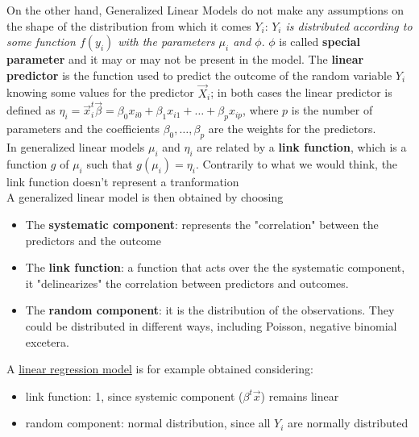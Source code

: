     On the other hand, Generalized Linear Models do not make any assumptions on
    the shape of the distribution from which it comes $Y_i$:  \emph{$Y_i$ is
    distributed according to some function $f(y_i)$ with the parameters $\mu_i$
    and $\phi$}. $\phi$ is called \textbf{special parameter} and it may or may
    not be present in the model. The \textbf{linear predictor} is the function
    used to predict the outcome of the random variable $Y_i$ knowing some values
    for the predictor $\vec{X}_i$; in both cases the linear predictor is defined
    as $\eta_i = \vec{x}_i^t\vec{\beta} = \beta_0x_{i0} + \beta_1x_{i1} + \dots
    + \beta_px_{ip}$, where $p$ is the number of parameters and the coefficients
    $\beta_0, \dots, \beta_p$ are the weights for the predictors. \\
    \noindent In generalized linear models $\mu_i$ and $\eta_i$ are related by a
    \textbf{link function}, which is a function $g$ of $\mu_i$ such that
    $g(\mu_i) = \eta_i$. Contrarily to what we would think, the link function
    doesn't represent a tranformation \\
    
    A generalized linear model is then obtained by choosing
    \begin{itemize}
      \item The \textbf{systematic component}: represents the "correlation"
      between the predictors and the outcome \label{sent: linkFunc}
      \item The \textbf{link function}: a function that acts over the the
      systematic component, it "delinearizes" the correlation between predictors
      and outcomes.
      \item The \textbf{random component}: it is the distribution of the
      observations. They could be distributed in different ways, including
      Poisson, negative binomial excetera. \\
    \end{itemize}

    \noindent A \underline{linear regression model} is for example obtained
    considering:
    
    \begin{itemize}
      \item link function: 1, since systemic component ($\beta^t \vec{x}$)
      remains linear
      \item random component: normal distribution, since all $Y_i$ are normally
      distributed
    \end{itemize}
    
